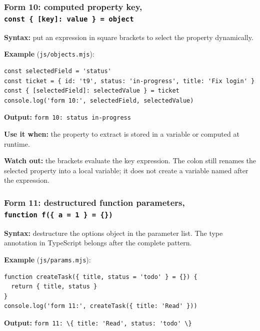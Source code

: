 \documentclass[
]{article}
\newcommand{\passthrough}[1]{#1}
\begin{document}
\subsubsection{\texorpdfstring{Form 10: computed property key,
\texttt{const\ \{\ {[}key{]}:\ value\ \}\ =\ object}}{Form 10: computed property key, const \{ {[}key{]}: value \} = object}}\label{form-10-computed-property-key-const--key-value---object}

\textbf{Syntax:} put an expression in square brackets to select the
property dynamically.

\textbf{Example} (\passthrough{\lstinline!js/objects.mjs!}):

\begin{lstlisting}
const selectedField = 'status'
const ticket = { id: 't9', status: 'in-progress', title: 'Fix login' }
const { [selectedField]: selectedValue } = ticket
console.log('form 10:', selectedField, selectedValue)
\end{lstlisting}

\textbf{Output:} \passthrough{\lstinline!form 10: status in-progress!}

\textbf{Use it when:} the property to extract is stored in a variable or
computed at runtime.

\textbf{Watch out:} the brackets evaluate the key expression. The colon
still renames the selected property into a local variable; it does not
create a variable named after the expression.

\subsubsection{\texorpdfstring{Form 11: destructured function
parameters,
\texttt{function\ f(\{\ a\ =\ 1\ \}\ =\ \{\})}}{Form 11: destructured function parameters, function f(\{ a = 1 \} = \{\})}}\label{form-11-destructured-function-parameters-function-f-a--1---}

\textbf{Syntax:} destructure the options object in the parameter list.
The type annotation in TypeScript belongs after the complete pattern.

\textbf{Example} (\passthrough{\lstinline!js/params.mjs!}):

\begin{lstlisting}
function createTask({ title, status = 'todo' } = {}) {
  return { title, status }
}
console.log('form 11:', createTask({ title: 'Read' }))
\end{lstlisting}

\textbf{Output:}
\passthrough{\lstinline!form 11: \{ title: 'Read', status: 'todo' \}!}
\end{document}
